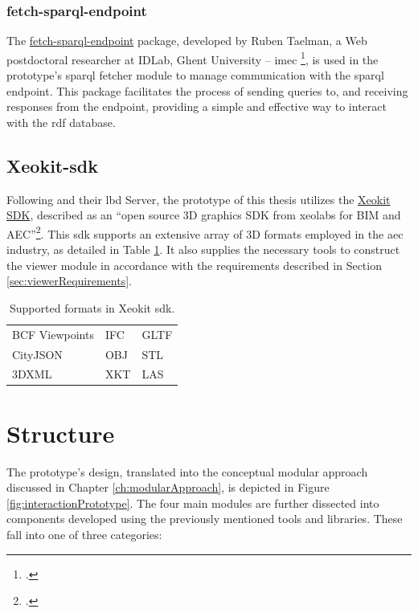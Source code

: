 \subsubsection{fetch-sparql-endpoint}
The \href{https://github.com/rubensworks/fetch-sparql-endpoint.js}{fetch-sparql-endpoint} package, developed by Ruben Taelman, a Web postdoctoral researcher at IDLab, Ghent University – imec \footcite{RubenTaelman}, is used in the prototype's \ac{sparql} fetcher module to manage communication with the \ac{sparql} endpoint. This package facilitates the process of sending queries to, and receiving responses from the endpoint, providing a simple and effective way to interact with the \ac{rdf} database.

\subsection{Xeokit-\acs{sdk}}
Following \cite{Malcolm2021} and their \ac{lbd} Server, the prototype of this thesis utilizes the \href{http://xeokit.io/index.html}{Xeokit SDK}, described as an \enquote{open source 3D graphics SDK from xeolabs for BIM and AEC}\footcite{xeokit}. This \ac{sdk} supports an extensive array of 3D formats employed in the \ac{aec} industry, as detailed in Table \ref{tab:xeokitFormats}. It also supplies the necessary tools to construct the viewer module in accordance with the requirements described in Section \ref{sec:viewerRequirements}.

\begin{table}[H]
    \centering
    \begin{tabular}{lll}
        \toprule
        BCF Viewpoints & IFC & GLTF \\
        CityJSON       & OBJ & STL  \\
        3DXML          & XKT & LAS  \\
        \bottomrule
    \end{tabular}
    \caption[Supported formats in Xeokit \acs{sdk}]{Supported formats in Xeokit \acs{sdk}.\footnotemark}
    \label{tab:xeokitFormats}
\end{table}

\section{Structure}
The prototype's design, translated into the conceptual modular approach discussed in Chapter \ref{ch:modularApproach}, is depicted in Figure \ref{fig:interactionPrototype}. The four main modules are further dissected into components developed using the previously mentioned tools and libraries. These fall into one of three categories:

